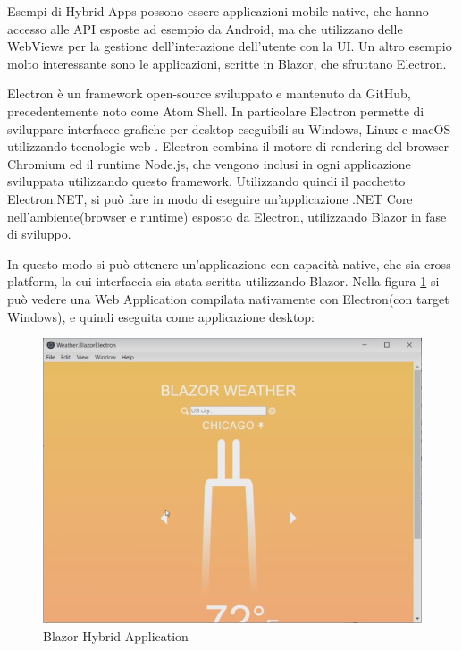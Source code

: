Esempi di Hybrid Apps possono essere applicazioni mobile native, che hanno accesso alle API esposte ad esempio da Android, ma che utilizzano delle WebViews per la gestione dell'interazione dell'utente con la UI.
Un altro esempio molto interessante sono le applicazioni, scritte in Blazor, che sfruttano Electron.

Electron \`e un framework open-source sviluppato e mantenuto da GitHub, precedentemente noto come Atom Shell.
In particolare Electron permette di sviluppare interfacce grafiche per desktop eseguibili su Windows, Linux e macOS utilizzando tecnologie web \cite{electronWiki}.
Electron combina il motore di rendering del browser Chromium ed il runtime Node.js, che vengono inclusi in ogni applicazione sviluppata utilizzando questo framework.
Utilizzando quindi il pacchetto Electron.NET, si pu\`o fare in modo di eseguire un'applicazione .NET Core nell'ambiente(browser e runtime) esposto da Electron, utilizzando Blazor in fase di sviluppo\cite{electronDotNet}.

In questo modo si pu\`o ottenere un'applicazione con capacit\`a native, che sia cross-platform, la cui interfaccia sia stata scritta utilizzando Blazor.
Nella figura \ref{fig:BlazorHybridApplication} si pu\`o vedere una Web Application compilata nativamente con Electron(con target Windows), e quindi eseguita come applicazione desktop:

\begin{figure}[H]
	\centerline{\includegraphics[scale=0.6]{figure/BlazorWeatherElectron.png}}
	\caption{Blazor Hybrid Application}
	\label{fig:BlazorHybridApplication}
\end{figure}


